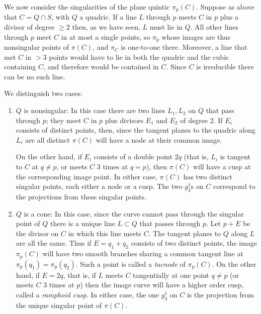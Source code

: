 \documentclass[12pt, leqno]{article}
\begin{document}
We now consider the singularities of the plane quintic $\pi_p(C)$. Suppose as above that $C = Q\cap S$, with $Q$ a quadric. If a line $L$ through $p$ meets $C$ in $p$ plus a divisor of degree $\geq 2$ then, as we have seen, $L$ must lie in $Q$.  All other lines through $p$ meet $C$ in at most a single points, so $\pi_p$ whose images are thus nonsingular points of $\pi(C)$, and $\pi_C$ is one-to-one there. Moreover, a line that met $C$ in $>3$ points would have to lie in both the quadric and the cubic containing $C$, and therefore would be contained in $C$. Since $C$ is irreducible there can be no such line.

We distinguish two cases:

\begin{enumerate}
\item $Q$ is nonsingular:
In this case there are two lines $L_1, L_2$ on $Q$ that pass through $p$; they meet $C$ in $p$ plus divisors $E_1$ and $E_2$ of degree 2. If $E_i$ consists of distinct points, then, since the tangent planes to the quadric along $L_i$ are all distinct $\pi(C)$ will have a node at their common image. 


On the other hand, if $E_i$ consists of a double point $2q$ (that is, $L_i$ is tangent to $C$ at $q\neq p$, or meets $C$ 3 times at $q = p$), then $\pi(C)$ will have a cusp at the corresponding image point. 
In either case, $\pi(C)$ has two distinct singular points, each either a node or a cusp. The two $g^1_3$s on $C$ correspond to the projections from these singular points.

\item $Q$ is a cone:
In this case, since the curve cannot pass through the singular point of $Q$ there is a unique line $L\subset Q$ that passes through $p$. Let $p+E$ be the divisor on $C$ in which this line meets $C$. The tangent planes to $Q$ along $L$ are all the same. Thus if $E = q_1+q_2$ consists of two distinct points, the image $\pi_p(C)$ will have two smooth branches sharing a common tangent line at
$\pi_p(q_1) = \pi_p(q_2)$. Such a point is called a \emph{tacnode} of $\pi_p(C)$. On the other hand, if $E= 2q$, that is, if $L$ meets $C$ tangentially at one point $q\neq p$ (or meets $C$ 3 times at $p$) then the image curve will have a higher order cusp, called a \emph{ramphoid cusp}. In either case, the one $g^1_3$ on $C$ is the projection from the unique singular point of $\pi(C)$.
\end{enumerate}
\end{document}
